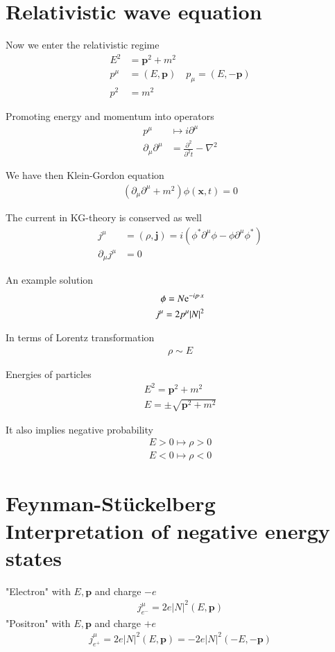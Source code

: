 \section{Relativistic wave equation}
Now we enter the relativistic regime
\begin{align*}
   E^2 &= \pmb{p}^2 + m^2 \\
   p^\mu &= (E, \pmb{p}) \quad p_\mu = (E, -\pmb{p}) \\
   p^2 &= m^2
\end{align*}

Promoting energy and momentum into operators
\begin{align*}
   p^\mu &\mapsto i \partial^\mu \\
   \partial_\mu \partial^\mu &= \frac{\partial ^2}{\partial^2 t} - \nabla^2
\end{align*}

We have then Klein-Gordon equation
\begin{align}
   (\partial_\mu \partial^\mu + m^2) \phi(\pmb{x}, t) = 0
\end{align}

The current in KG-theory is conserved as well
\begin{align}
   j^\mu &= (\rho, \pmb{j}) = i \left( \phi^* \partial^\mu \phi - \phi \partial^\mu \phi^* \right) \\
   \partial_\mu j^\mu &= 0
\end{align}

An example solution
\begin{align*}
   \phi = N \mathrm{e}^{-ip\cdot x} \\
   j^\mu = 2 p^\mu |N|^2
\end{align*}

In terms of Lorentz transformation
\begin{align*}
   \rho \sim E
\end{align*}

Energies of particles
\begin{align*}
   E^2 = \pmb{p}^2 + m^2 \\
   E = \pm \sqrt{\pmb{p}^2 + m^2}
\end{align*}

It also implies negative probability
\begin{align*}
   E > 0 \mapsto \rho > 0 \\
   E < 0 \mapsto \rho < 0
\end{align*}

\section{Feynman-Stückelberg Interpretation of negative energy states}
"Electron" with $E, \pmb{p}$ and charge $-e$
\begin{align*}
   j^\mu_{e^-} = 2e|N|^2(E,\pmb{p})
\end{align*}
"Positron" with $E, \pmb{p}$ and charge $+e$
\begin{align*}
   j^\mu_{e^+} = 2e|N|^2(E,\pmb{p})
   = - 2e|N|^2(-E,-\pmb{p})
\end{align*}

